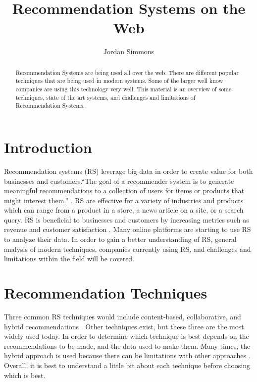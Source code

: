 \documentclass[sigconf]{acmart}
\begin{document}
\title{Recommendation Systems on the Web}


\author{Jordan Simmons}

\renewcommand{\shortauthors}{B. Trovato et al.}


\begin{abstract}
Recommendation Systems are being used all over the web. There are different popular techniques that are being used in modern systems. Some of the larger well know companies are using this technology very well. This material is an overview of some techniques, state of the art systems, and challenges and limitations of Recommendation Systems.
\end{abstract}



\maketitle

\section{Introduction}

Recommendation systems (RS)  leverage big data in order to create value for both businesses and customers.``The goal of a recommender system is to generate meaningful recommendations to a collection of users for items or products that might interest them.'' \cite{Melville2010}. RS are effective for a variety of industries and products which can range from  a product in a store, a news article on a site, or a search query. RS is beneficial to businesses and customers by increasing metrics such as revenue and customer satisfaction \cite{Amatriain2006}. Many online platforms are starting to use RS to analyze their data. In order to gain a better understanding of RS, general analysis of modern techniques, companies currently using RS, and challenges and limitations within the field will be covered.

\section{Recommendation Techniques}
Three common RS techniques would include content-based, collaborative, and hybrid recommendations \cite{Adomavicius2005}. Other techniques exist, but these three are the most widely used today. In order to
determine which technique is best depends on the recommendations to be made, and the data used to make them.
Many times, the hybrid approach is used because there can be limitations with other approaches
\cite{Adomavicius2005}. Overall, it is best to understand a little bit about each technique before choosing
which is best. 
\end{document}
